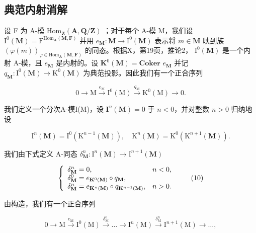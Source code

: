 \subsection{典范内射消解}

设 F 为 A-模 \(\mathrm{Hom}_{\mathbf{Z}}(\mathbf{A},\mathbf{Q} / \mathbf{Z})\) ；对于每个 A-模 M，我们设 \(\mathrm{I}^0 (\mathbf{M}) = \mathrm{F}^{\mathrm{Hom}_{\mathbf{A}}(\mathbf{M},\mathbf{F})}\) 并用 \(e_{\mathbf{M}}:\mathbf{M}\to \mathrm{I}^{0}(\mathbf{M})\) 表示将 \(m\in \mathbf{M}\) 映到族 \((\varphi (m))_{\varphi \in \mathrm{Hom}_{\mathbf{A}}(\mathbf{M},\mathbf{F})}\) 的同态。根据X，第19页，推论2， \(\mathrm{I}^0 (\mathbf{M})\) 是一个内射 A-模，且 \(e_{\mathbf{M}}\) 是内射的。设 \(\mathbf{K}^0 (\mathbf{M}) = \mathbf{Coker}\) \(e_{\mathbf{M}}\) 并记 \(q_{\mathbf{M}}:\mathrm{I}^0 (\mathbf{M})\to \mathrm{K}^0 (\mathbf{M})\) 为典范投影。因此我们有一个正合序列

\[
0 \longrightarrow \mathrm{M} \stackrel {e _ {\mathrm{M}}} {\longrightarrow} \mathrm{I} ^ {0} (\mathrm{M}) \stackrel {q _ {\mathrm{M}}} {\longrightarrow} \mathrm{K} ^ {0} (\mathrm{M}) \longrightarrow 0.
\]

我们定义一个分次A-模I(M)，设 \(\mathbf{I}^n (\mathbf{M}) = 0\) 于 \(n < 0\)，并对整数 \(n > 0\) 归纳地设

\[
\mathrm{I} ^ {n} (\mathbf {M}) = \mathrm{I} ^ {0} \left(\mathrm{K} ^ {n - 1} (\mathbf {M})\right), \quad \mathrm{K} ^ {n} (\mathbf {M}) = \mathrm{K} ^ {0} \left(\mathrm{K} ^ {n + 1} (\mathbf {M})\right).\tag{9}
\]

我们由下式定义 A-同态 \(\delta_{\mathbf{M}}^{n}:\mathrm{I}^{n}(\mathbf{M})\to \mathrm{I}^{n + 1}(\mathbf{M})\)

\[
\left\{ \begin{array}{l l} \delta_ {\mathbf {M}} ^ {n} = 0, & n <   0, \\ \delta_ {\mathbf {M}} ^ {0} = e _ {\mathbf {K} ^ {0} (\mathbf {M})} \circ q _ {\mathbf {M}}, \\ \delta_ {\mathbf {M}} ^ {n} = e _ {\mathbf {K} ^ {n} (\mathbf {M})} \circ q _ {\mathbf {K} ^ {n - 1} (\mathbf {M})}, & n > 0. \end{array} \right.\tag{10}
\]

由构造，我们有一个正合序列

\[
0 \longrightarrow \mathrm{M} \xrightarrow {e _ {\mathrm{M}}} \mathrm{I} ^ {0} (\mathrm{M}) \xrightarrow {\delta_ {\mathrm{M}} ^ {0}} \dots \longrightarrow \mathrm{I} ^ {n} (\mathrm{M}) \xrightarrow {\delta_ {\mathrm{M}} ^ {n}} \mathrm{I} ^ {n + 1} (\mathrm{M}) \longrightarrow \dots ,
\]

